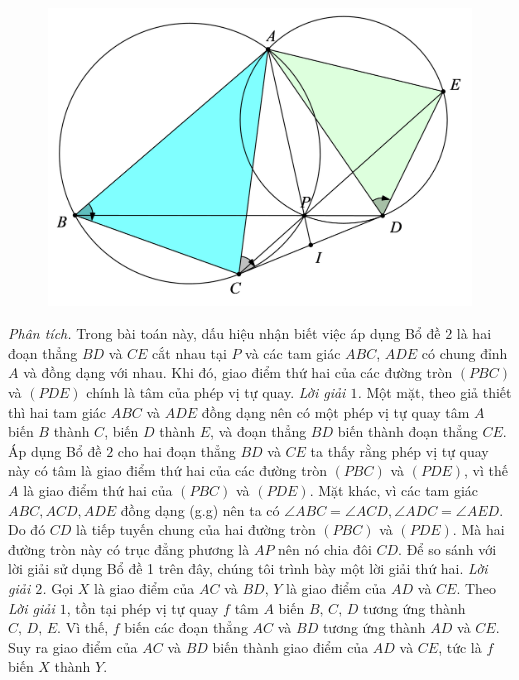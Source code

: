 \begin{multicols}{2}
	\begin{figure}[H]
		\vspace*{-5pt}
		\centering
		\captionsetup{labelformat= empty, justification=centering}
		\includegraphics[width= 1\linewidth]{9}
		\vspace*{-15pt}
	\end{figure}
	\textit{Phân tích.} Trong bài toán này, dấu hiệu nhận biết việc áp dụng Bổ đề $2$ là hai đoạn thẳng $BD$ và $CE$ cắt nhau tại $P$ và các tam giác $ABC$, $ADE$ có chung đỉnh $A$ và đồng dạng với nhau. Khi đó, giao điểm thứ hai của các đường tròn $(PBC)$ và $(PDE)$ chính là tâm của phép vị tự quay. 
	\vskip 0.1cm
	\textit{Lời giải $1$.} Một mặt, theo giả thiết thì hai tam giác $ABC$ và $ADE$ đồng dạng nên có một phép vị tự quay tâm $A$ biến $B$ thành $C$, biến $D$ thành $E$, và đoạn thẳng $BD$ biến thành đoạn thẳng $CE$. Áp dụng Bổ đề $2$ cho hai đoạn thẳng $BD$ và $CE$ ta thấy rằng phép vị tự quay này có tâm là giao điểm thứ hai của các đường tròn $(PBC)$ và $(PDE)$, vì thế $A$ là giao điểm thứ hai của $(PBC)$ và $(PDE)$.
	\vskip 0.1cm
	Mặt khác, vì các tam giác $ABC,ACD,ADE$ đồng dạng (g.g) nên ta có $\angle ABC = \angle ACD, \angle ADC = \angle AED$. Do đó $CD$ là tiếp tuyến chung của hai đường tròn $(PBC)$ và $(PDE)$. Mà hai đường tròn này có trục đẳng phương là $AP$ nên nó chia đôi $CD$.
	\vskip 0.1cm
	Để so sánh với lời giải sử dụng Bổ đề 1 trên đây, chúng tôi trình bày một lời giải thứ hai.
	\textit{Lời giải $2$.} Gọi $X$ là giao điểm của $AC$ và $BD$, $Y$ là giao điểm của $AD$ và $CE$. Theo \textit{Lời giải $1$}, tồn tại phép vị tự quay $f$ tâm $A$ biến $B,\,C,\,D$ tương ứng thành $C,\,D,\,E$. Vì thế, $f$ biến các đoạn thẳng $AC$ và $BD$ tương ứng thành $AD$ và $CE$. Suy ra giao điểm của $AC$ và $BD$ biến thành giao điểm của $AD$ và $CE$, tức là $f$ biến $X$ thành $Y$.

\end{multicols}

